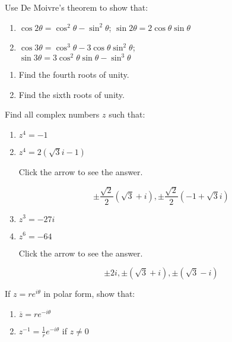 \documentclass{ximera}
\begin{document}
\begin{problem}\label{prb:A.21}
Use De Moivre's theorem to show that:

\begin{enumerate}[label={\alph*.}]
\item $\cos 2\theta = \cos^{2} \theta - \sin^{2} \theta$; $\sin 2\theta = 2 \cos \theta \sin \theta$

\item $\cos 3\theta = \cos^{3} \theta - 3 \cos \theta \sin^{2} \theta$; \\
$\sin 3\theta = 3 \cos^2 \theta \sin \theta - \sin^3 \theta$

\end{enumerate}
\end{problem}

\begin{problem}\label{prb:A.22}
\begin{enumerate}[label={\alph*.}]
\item Find the fourth roots of unity.

\item Find the sixth roots of unity.

\end{enumerate}
\end{problem}

\begin{problem}\label{prb:A.23}
Find all complex numbers $z$ such that:

\begin{enumerate}
\item $z^{4} = -1$
\item $z^{4} = 2(\sqrt{3}i - 1)$

Click the arrow to see the answer.
\begin{expandable}
 $$\pm \frac{\sqrt{2}}{2}(\sqrt{3}+i), \pm \frac{\sqrt{2}}{2}(-1 + \sqrt{3}i)$$
\end{expandable}

\item $z^{3} = -27i$
\item $z^{6} = -64$

Click the arrow to see the answer.
\begin{expandable}
$$\pm 2i, \pm (\sqrt{3} +i), \pm (\sqrt{3}-i)$$
\end{expandable}

\end{enumerate}
\end{problem}

\begin{problem}\label{prb:A.24}
If $z = re^{i\theta}$ in polar form, show that:

\begin{enumerate}
\item $\overline{z} = re^{-i\theta}$
\item $z^{-1}  = \frac{1}{r} e^{-i\theta}$ if  $z \neq 0 $
\end{enumerate}
\end{problem}
\end{document}
